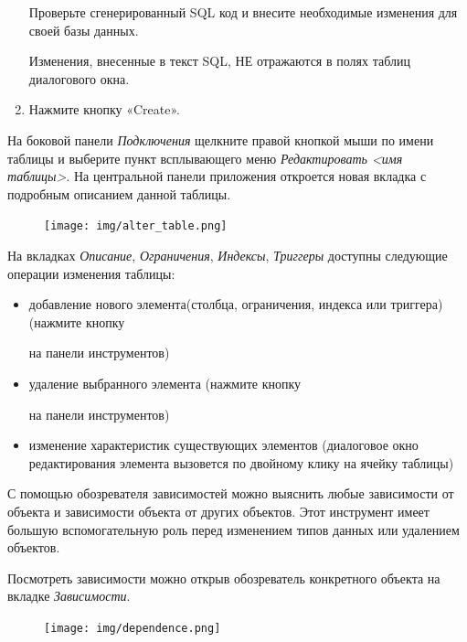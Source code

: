 \begin{enumerate}[leftmargin=26pt]
	Проверьте сгенерированный SQL код и внесите необходимые изменения для своей базы данных.
	
	Изменения, внесенные в текст SQL, НЕ отражаются в полях таблиц диалогового окна.
	\item Нажмите кнопку «Create».
\end{enumerate}

\label{sec:alttable}
На боковой панели \textit{Подключения} щелкните правой кнопкой мыши по имени таблицы и выберите пункт всплывающего меню \textit{Редактировать <имя таблицы>}. На центральной панели приложения откроется новая вкладка с подробным описанием данной таблицы. 

\begin{figure}[H]
	\centering
	\texttt{[image: img/alter\_table.png]}
\end{figure}

На вкладках \textit{Описание}, \textit{Ограничения}, \textit{Индексы}, \textit{Триггеры} доступны следующие операции изменения таблицы:
\begin{itemize}
	\item добавление нового элемента(столбца, ограничения, индекса или триггера) (нажмите кнопку  на панели инструментов)
	\item удаление выбранного элемента (нажмите кнопку  на панели инструментов)
	\item изменение характеристик существующих элементов (диалоговое окно редактирования элемента вызовется по двойному клику на ячейку таблицы)
\end{itemize}


С помощью обозревателя зависимостей можно выяснить любые зависимости от объекта и зависимости объекта от других объектов. Этот инструмент имеет большую вспомогательную роль перед изменением типов данных или удалением объектов.

Посмотреть зависимости можно открыв обозреватель конкретного объекта на вкладке \textit{Зависимости}.

\begin{figure}[H]
	\centering
	\texttt{[image: img/dependence.png]}
\end{figure}

